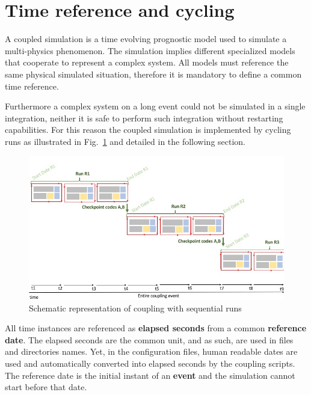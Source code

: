 \section{Time reference and cycling}\label{namcon:TIMECYCLE}
A coupled simulation is a time evolving prognostic model used to
simulate a multi-physics phenomenon. The simulation implies different
specialized models that cooperate to represent a complex system. All
models must reference the same physical simulated situation,
therefore it is mandatory to define a common time reference.

Furthermore a complex system on a long event could not be
simulated in a single integration, neither it is safe to perform such
integration without restarting capabilities. For this reason the
coupled simulation is implemented by cycling runs as
illustrated in Fig.~\ref{fig:schemacoupling_time3} and detailed in the following section.

\begin{figure}[htbp]
    \centering
        \centering \includegraphics[width=12cm]{graphics/schemacoupling_time3.jpeg}
    \caption{Schematic representation of coupling with sequential runs  }\label{fig:schemacoupling_time3}
\end{figure}

All time instances are referenced as {\bf elapsed seconds}
from a common {\bf reference date}. The elapsed seconds are the common unit, and as such, are used in files
and directories names. Yet, in the configuration files, human readable
dates are used and automatically converted into
elapsed seconds by the coupling scripts. The reference date is the initial instant of an
{\bf event} and the simulation cannot start before that date.

